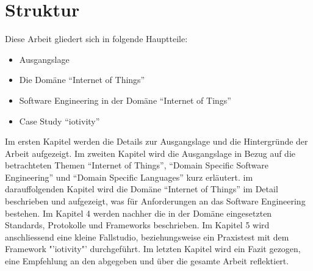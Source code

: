\section{Struktur}
Diese Arbeit gliedert sich in folgende Hauptteile:

\begin{itemize}
\item Ausgangslage
\item Die Domäne "`Internet of Things"'
\item Software Engineering in der Domäne "`Internet of Tings"'
\item Case Study "`iotivity"'
\end{itemize}

Im ersten Kapitel werden die Details zur Ausgangslage und die Hintergründe der Arbeit aufgezeigt. Im zweiten Kapitel wird die Ausgangslage in Bezug auf die betrachteten Themen "`Internet of Things"', "`Domain Specific Software Engineering"' und "`Domain Specific Languages"' kurz erläutert. im darauffolgenden Kapitel wird die Domäne "`Internet of Things"' im Detail beschrieben und aufgezeigt, was für Anforderungen an das Software Engineering bestehen. Im Kapitel 4 werden nachher die in der Domäne eingesetzten Standards, Protokolle und Frameworks beschrieben. Im Kapitel 5 wird anschliessend eine kleine Fallstudio, beziehungsweise ein Praxistest mit dem Framework "'iotivity"' durchgeführt. Im letzten Kapitel wird ein Fazit gezogen, eine Empfehlung an den  abgegeben und über die gesamte Arbeit reflektiert.
